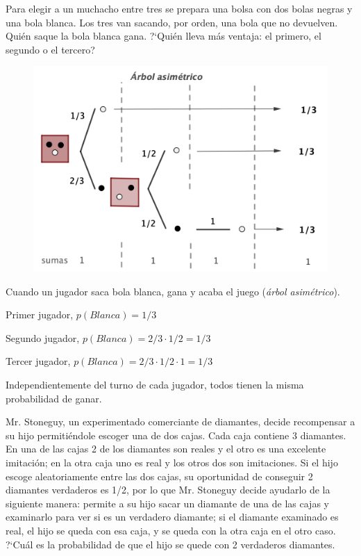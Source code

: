 \vspace{5mm}
\begin{ejemplo}
\begin{ejer}
Para elegir a un muchacho entre tres se prepara una bolsa con dos bolas negras y una bola blanca. Los tres van sacando, por orden, una bola que no devuelven. Quién saque la bola blanca gana. ?`Quién lleva más ventaja: el primero, el segundo o el tercero? 	
\end{ejer}
\end{ejemplo}
\begin{multicols}{2}
	\begin{figure}[H]
				\centering
			\includegraphics[width=.5\textwidth]{imagenes/imagenes02/T02IM34.png}
	\end{figure}
Cuando un jugador saca bola blanca, gana y acaba el juego (\emph{árbol asimétrico}).

Primer jugador, $p(Blanca)=1/3$

Segundo jugador, $p(Blanca)=2/3 \cdot 1/2=1/3$

Tercer jugador, $p(Blanca)=2/3 \cdot 1/2 \cdot 1=1/3$

Independientemente del turno de cada jugador, todos tienen la misma probabilidad de ganar.
\end{multicols}
\vspace{5mm}
\begin{ejemplo}

\begin{ejer}
Mr. Stoneguy, un experimentado comerciante de diamantes, decide recompensar a su hijo permitiéndole escoger una de dos cajas. Cada caja contiene 3 diamantes. En una de las cajas 2 de los diamantes son reales y el otro es una excelente imitación; en la otra caja uno es real y los otros dos son imitaciones. Si el hijo escoge aleatoriamente entre las dos cajas, su oportunidad de conseguir 2 diamantes verdaderos es 1/2, por lo que Mr. Stoneguy decide ayudarlo de la siguiente manera: permite a su hijo sacar un diamante de una de las cajas y examinarlo para ver si es un verdadero diamante; si el diamante examinado es real, el hijo se queda con esa caja, y se queda con la otra caja en el otro caso. ?`Cuál es la probabilidad de que el hijo se quede con 2 verdaderos diamantes. 	
\end{ejer}
\end{ejemplo}

